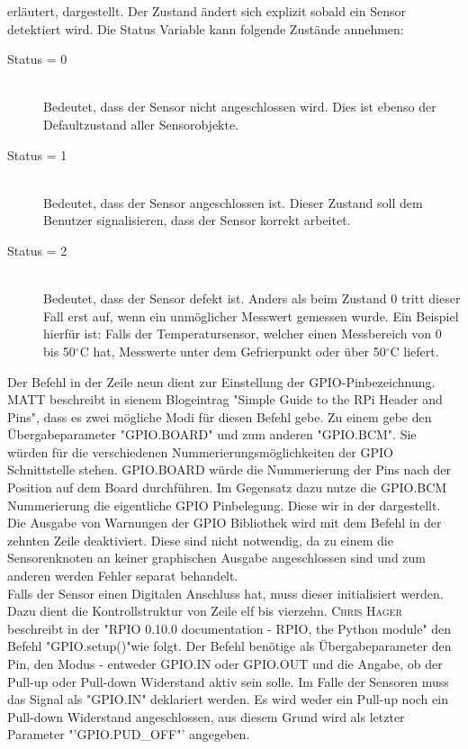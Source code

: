 	erläutert, dargestellt. Der Zustand ändert sich explizit sobald ein Sensor detektiert wird. Die Status Variable kann folgende Zustände annehmen:
	\begin{description}
		\item[Status = 0] \hfill \\
			Bedeutet, dass der Sensor nicht angeschlossen wird. Dies ist ebenso der Defaultzustand aller Sensorobjekte.
		\item[Status = 1] \hfill \\
			Bedeutet, dass der Sensor angeschlossen ist. Dieser Zustand soll dem Benutzer signalisieren, dass der Sensor korrekt arbeitet.
		\item[Status = 2] \hfill \\
			Bedeutet, dass der Sensor defekt ist. Anders als beim Zustand 0 tritt dieser Fall erst auf, wenn ein unmöglicher Messwert gemessen wurde. Ein Beispiel hierfür ist: Falls der Temperatursensor, welcher einen Messbereich von 0 bis 50$^\circ$C hat, Messwerte unter dem Gefrierpunkt oder über 50$^\circ$C liefert.
	\end{description}
	Der Befehl in der Zeile neun dient zur Einstellung der GPIO-Pinbezeichnung. \textsc{MATT} beschreibt in sienem Blogeintrag "Simple Guide to the RPi Header and Pins"\cite{SimpleGu6:online}, dass es zwei mögliche Modi für diesen Befehl gebe. Zu einem gebe den Übergabeparameter "GPIO.BOARD" und zum anderen "GPIO.BCM". Sie würden für die verschiedenen Nummerierungsmöglichkeiten der \ac{GPIO} Schnittstelle stehen. GPIO.BOARD würde die Nummerierung der Pins nach der Position auf dem Board durchführen. Im Gegensatz dazu nutze die GPIO.BCM Nummerierung die eigentliche GPIO Pinbelegung. Diese wir in der  dargestellt.\\
	Die Ausgabe von Warnungen der GPIO Bibliothek wird mit dem Befehl in der zehnten Zeile deaktiviert. Diese sind nicht notwendig, da zu einem die Sensorenknoten an keiner graphischen Ausgabe angeschlossen sind und zum anderen werden Fehler separat behandelt.\\
	Falls der Sensor einen Digitalen Anschluss hat, muss dieser initialisiert werden. Dazu dient die Kontrollstruktur von Zeile elf bis vierzehn. \textsc{Chris Hager} beschreibt in der "RPIO 0.10.0 documentation - RPIO, the Python module" den Befehl "GPIO.setup()"\space wie folgt. Der Befehl benötige als Übergabeparameter den Pin, den Modus - entweder GPIO.IN oder GPIO.OUT und die Angabe, ob der Pull-up oder Pull-down Widerstand aktiv sein solle. Im Falle der Sensoren muss das Signal als "GPIO.IN" deklariert werden. Es wird weder ein Pull-up noch ein Pull-down Widerstand angeschlossen, aus diesem Grund wird als letzter Parameter "'GPIO.PUD\_OFF"' angegeben. \\

